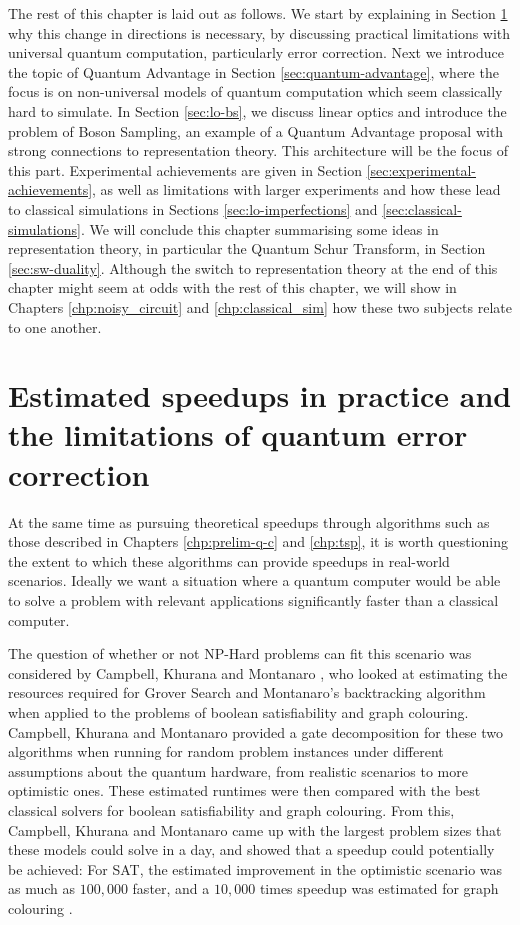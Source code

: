 The rest of this chapter is laid out as follows. We start by explaining in Section \ref{sec:error-correction} why this change in directions is necessary, by discussing practical limitations with universal quantum computation, particularly error correction. Next we introduce the topic of Quantum Advantage in Section \ref{sec:quantum-advantage}, where the focus is on non-universal models of quantum computation which seem classically hard to simulate. In Section \ref{sec:lo-bs}, we discuss linear optics and introduce the problem of Boson Sampling, an example of a Quantum Advantage proposal with strong connections to representation theory. This architecture will be the focus of this part. Experimental achievements are given in Section \ref{sec:experimental-achievements}, as well as limitations with larger experiments and how these lead to classical simulations in Sections \ref{sec:lo-imperfections} and \ref{sec:classical-simulations}. We will conclude this chapter summarising some ideas in representation theory, in particular the Quantum Schur Transform, in Section \ref{sec:sw-duality}. Although the switch to representation theory at the end of this chapter might seem at odds with the rest of this chapter, we will show in Chapters \ref{chp:noisy_circuit} and \ref{chp:classical_sim} how these two subjects relate to one another.

\section{Estimated speedups in practice and the limitations of quantum error correction}
\label{sec:error-correction}

At the same time as pursuing theoretical speedups through algorithms such as those described in Chapters \ref{chp:prelim-q-c} and \ref{chp:tsp}, it is worth questioning the extent to which these algorithms can provide speedups in real-world scenarios. Ideally we want a situation where a quantum computer would be able to solve a problem with relevant applications significantly faster than a classical computer.

The question of whether or not NP-Hard problems can fit this scenario was considered by Campbell, Khurana and Montanaro \cite{campbell2019}, who looked at estimating the resources required for Grover Search and Montanaro's backtracking algorithm when applied to the problems of boolean satisfiability and graph colouring. Campbell, Khurana and Montanaro provided a gate decomposition for these two algorithms when running for random problem instances under different assumptions about the quantum hardware, from realistic scenarios to more optimistic ones. These estimated runtimes were then compared with the best classical solvers for boolean satisfiability and graph colouring. From this, Campbell, Khurana and Montanaro came up with the largest problem sizes that these models could solve in a day, and showed that a speedup could potentially be achieved: For SAT, the estimated improvement in the optimistic scenario was as much as $100,000$ faster, and a $10,000$ times speedup was estimated for graph colouring \cite{campbell2019}.

